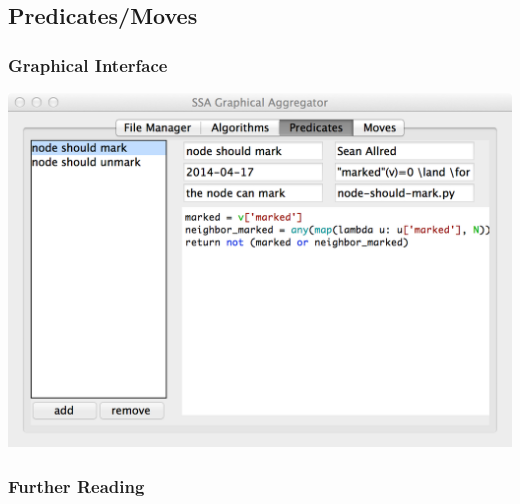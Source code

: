 \documentclass[
]{beamer}
\begin{document}
\subsection{Predicates\slash Moves}
\begin{frame}
  \frametitle{Graphical Interface}
  \centering
  \includegraphics[width=\textwidth]{../figs/2}
\end{frame}

\begin{frame}
  \frametitle{Further Reading}
  \begin{thebibliography}{}
  \bibitem{}
  \end{thebibliography}
\end{frame}
\end{document}

